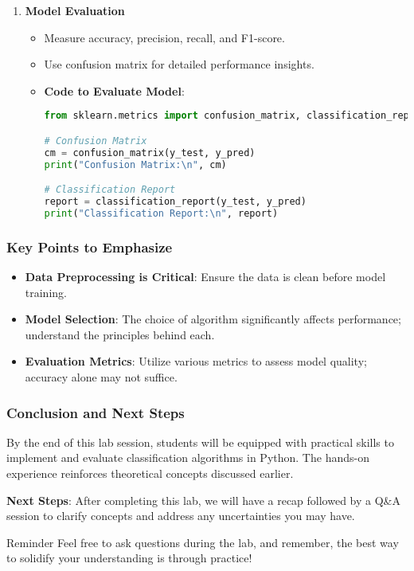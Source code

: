 \documentclass[aspectratio=169]{beamer}
\begin{document}
\begin{frame}[fragile]
\begin{enumerate}
        \item \textbf{Model Evaluation}
        \begin{itemize}
            \item Measure accuracy, precision, recall, and F1-score.
            \item Use confusion matrix for detailed performance insights.
            \item \textbf{Code to Evaluate Model}:
            \begin{lstlisting}[language=Python]
from sklearn.metrics import confusion_matrix, classification_report

# Confusion Matrix
cm = confusion_matrix(y_test, y_pred)
print("Confusion Matrix:\n", cm)

# Classification Report
report = classification_report(y_test, y_pred)
print("Classification Report:\n", report)
            \end{lstlisting}
        \end{itemize}
    \end{enumerate}
\end{frame}

\begin{frame}
    \frametitle{Key Points to Emphasize}
    \begin{itemize}
        \item \textbf{Data Preprocessing is Critical}: Ensure the data is clean before model training.
        \item \textbf{Model Selection}: The choice of algorithm significantly affects performance; understand the principles behind each.
        \item \textbf{Evaluation Metrics}: Utilize various metrics to assess model quality; accuracy alone may not suffice.
    \end{itemize}
\end{frame}

\begin{frame}
    \frametitle{Conclusion and Next Steps}
    By the end of this lab session, students will be equipped with practical skills to implement and evaluate classification algorithms in Python. 
    The hands-on experience reinforces theoretical concepts discussed earlier.

    \textbf{Next Steps}:
    After completing this lab, we will have a recap followed by a Q\&A session to clarify concepts and address any uncertainties you may have.
    
    \begin{block}{Reminder}
        Feel free to ask questions during the lab, and remember, the best way to solidify your understanding is through practice!
    \end{block}
\end{frame}
\end{document}
